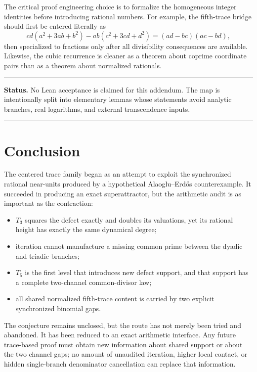 \documentclass[11pt,oneside]{article}
\theoremstyle{definition}
\theoremstyle{remark}
\newenvironment{statusbox}[1]
{\begin{center}\begin{minipage}{0.94\textwidth}\raggedright\hrule\vspace{0.42em}
\textbf{Status.} #1\par\vspace{0.32em}}
{\vspace{0.32em}\hrule\end{minipage}\end{center}}
\begin{document}
The critical proof engineering choice is to formalize the homogeneous integer identities
before introducing rational numbers.  For example, the fifth-trace bridge should first be
entered literally as
\[
 cd(a^2+3ab+b^2)-ab(c^2+3cd+d^2)=(ad-bc)(ac-bd),
\]
then specialized to fractions only after all divisibility consequences are available.
Likewise, the cubic recurrence is cleaner as a theorem about coprime coordinate pairs than as
a theorem about normalized rationals.

\begin{statusbox}{No Lean acceptance is claimed for this addendum.  The map is intentionally
split into elementary lemmas whose statements avoid analytic branches, real logarithms, and
external transcendence inputs.}
\end{statusbox}

\section{Conclusion}

The centered trace family began as an attempt to exploit the synchronized rational near-units
produced by a hypothetical Alaoglu--Erd\H{o}s counterexample.  It succeeded in producing an
exact superattractor, but the arithmetic audit is as important as the contraction:
\begin{itemize}
\item \(T_3\) squares the defect exactly and doubles its valuations, yet its rational height
has exactly the same dynamical degree;
\item iteration cannot manufacture a missing common prime between the dyadic and triadic
branches;
\item \(T_5\) is the first level that introduces new defect support, and that support has a
complete two-channel common-divisor law;
\item all shared normalized fifth-trace content is carried by two explicit synchronized
binomial gaps.
\end{itemize}

The conjecture remains unclosed, but the route has not merely been tried and abandoned.  It
has been reduced to an exact arithmetic interface.  Any future trace-based proof must obtain
new information about shared support or about the two channel gaps; no amount of unaudited
iteration, higher local contact, or hidden single-branch denominator cancellation can replace
that information.

\appendix
\end{document}
